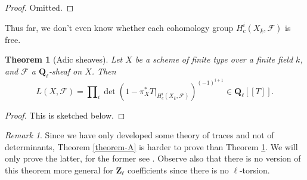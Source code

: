 \documentclass{stacks-project}
\theoremstyle{plain}
\newtheorem{theorem}[subsection]{Theorem}
\theoremstyle{definition}
\theoremstyle{remark}
\newtheorem{remark}[subsection]{Remark}
\numberwithin{equation}{subsection}
\begin{document}
\begin{proof}
Omitted.
\end{proof}

\noindent
Thus far, we don't even know whether each cohomology group
$H^i_c(X_{\bar k}, \mathcal{F})$ is free.

\begin{theorem}[Adic sheaves]
\label{theorem-B}
Let $X$ be a scheme of finite type over a finite field $k$, and $\mathcal{F}$ a
$\mathbf{Q}_\ell$-sheaf on $X$. Then
$$
L(X, \mathcal{F}) =
\prod\nolimits_i
\det(1 - \pi_X^*T |_{H_c^i(X_{\bar k} , \mathcal{F})})^{(-1)^{i + 1}}
\in \mathbf{Q}_\ell[[T]].
$$
\end{theorem}

\begin{proof}
This is sketched below.
\end{proof}

\begin{remark}
\label{remark-which-is-harder}
Since we have only developed some theory of traces and not of determinants,
Theorem \ref{theorem-A}
is harder to prove than
Theorem \ref{theorem-B}.
We will only prove the latter, for the former see \cite{SGA4.5}.
Observe also that there is no version of this theorem more general for
$\mathbf{Z}_\ell$ coefficients since there is no $\ell$-torsion.
\end{remark}
\end{document}
